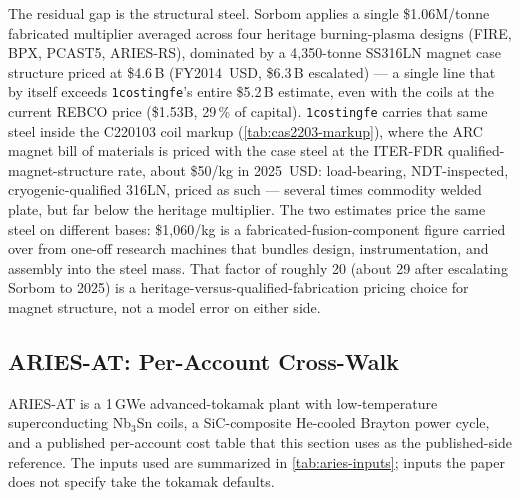 \documentclass{article}
\begin{document}
The residual gap is the structural steel. Sorbom applies a single
\$1.06M/tonne fabricated multiplier averaged across four heritage
burning-plasma designs (FIRE, BPX, PCAST5, ARIES-RS), dominated by a
4{,}350-tonne SS316LN magnet case structure priced at \$4.6\,B (FY2014~USD,
\$6.3\,B escalated) --- a single line that by itself exceeds
\texttt{1costingfe}'s entire \$5.2\,B estimate, even with the coils at the
current REBCO price (\$1.53B, 29\,\% of capital). \texttt{1costingfe}
carries that same steel inside the C220103 coil markup
(\cref{tab:cas2203-markup}), where the ARC magnet bill of materials is
priced with the case steel at the ITER-FDR qualified-magnet-structure rate,
about \$50/kg in 2025~USD: load-bearing, NDT-inspected, cryogenic-qualified
316LN, priced as such --- several times commodity welded plate, but far
below the heritage multiplier. The two estimates price the same steel on
different bases: \$1{,}060/kg is a fabricated-fusion-component figure
carried over from one-off research machines that bundles design,
instrumentation, and assembly into the steel mass. That factor of roughly
20 (about 29 after escalating Sorbom to 2025) is a
heritage-versus-qualified-fabrication pricing choice for magnet structure,
not a model error on either side.

\subsection{ARIES-AT: Per-Account Cross-Walk}
\label{sec:benchmark-aries}

ARIES-AT \citep{najmabadi2006ariesat} is a 1\,GWe advanced-tokamak
plant with low-temperature superconducting Nb$_3$Sn coils, a
SiC-composite He-cooled Brayton power cycle, and a published
per-account cost table that this section uses as the published-side
reference. The inputs used are summarized in \cref{tab:aries-inputs};
inputs the paper does not specify take the tokamak defaults.
\end{document}
